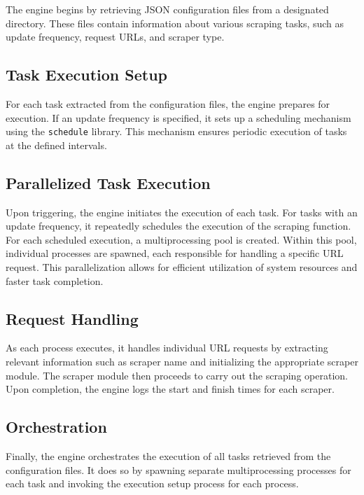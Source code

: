 {	The engine begins by retrieving JSON configuration files from a designated directory. These files contain information about various scraping tasks, such as update frequency, request URLs, and scraper type.

	\subsection*{Task Execution Setup}

	For each task extracted from the configuration files, the engine prepares for execution. If an update frequency is specified, it sets up a scheduling mechanism using the \texttt{schedule} library. This mechanism ensures periodic execution of tasks at the defined intervals.

	\subsection*{Parallelized Task Execution}

	Upon triggering, the engine initiates the execution of each task. For tasks with an update frequency, it repeatedly schedules the execution of the scraping function. For each scheduled execution, a multiprocessing pool is created. Within this pool, individual processes are spawned, each responsible for handling a specific URL request. This parallelization allows for efficient utilization of system resources and faster task completion.

	\subsection*{Request Handling}

	As each process executes, it handles individual URL requests by extracting relevant information such as scraper name and initializing the appropriate scraper module. The scraper module then proceeds to carry out the scraping operation. Upon completion, the engine logs the start and finish times for each scraper.

	\subsection*{Orchestration}

	Finally, the engine orchestrates the execution of all tasks retrieved from the configuration files. It does so by spawning separate multiprocessing processes for each task and invoking the execution setup process for each process.}

